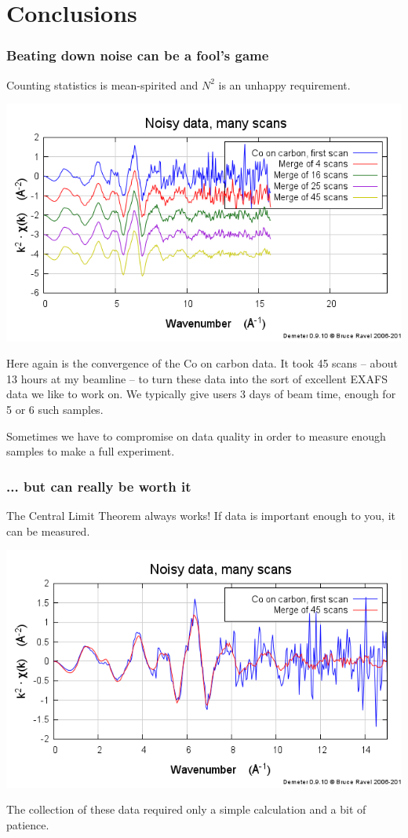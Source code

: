 \documentclass[10pt, xcolor=x11names, compress]{beamer}
\begin{document}
\section{Conclusions}

\begin{frame}
  \frametitle{Beating down noise can be a fool's game}
  \small%
  \begin{center}
    \alert{Counting statistics is mean-spirited and $N^2$ is an
      unhappy requirement.}
  \end{center}

  \begin{center}
    \includegraphics[width=0.55\linewidth]{images/CoGr.png}
  \end{center}

  Here again is the convergence of the Co on carbon data.
  It took 45 scans -- about 13 hours at my beamline -- to turn these
  data into the sort of excellent EXAFS data we like to work on.  We
  typically give users 3 days of beam time, enough for 5 or 6 such
  samples.

  \bigskip

  \begin{alertblock}{}
    Sometimes we have to compromise on data quality in order to
    measure enough samples to make a full experiment.
  \end{alertblock}
\end{frame}

\begin{frame}
  \frametitle{... but can really be worth it}

  \begin{exampleblock}{}
    The Central Limit Theorem always works!  If data is important
    enough to you, it can be measured.
  \end{exampleblock}

  \begin{center}
    \includegraphics[width=0.55\linewidth]{images/merge_chik.png}

    \bigskip

    The collection of these data required only a simple calculation and
    a bit of patience.
  \end{center}
\end{frame}
\end{document}
